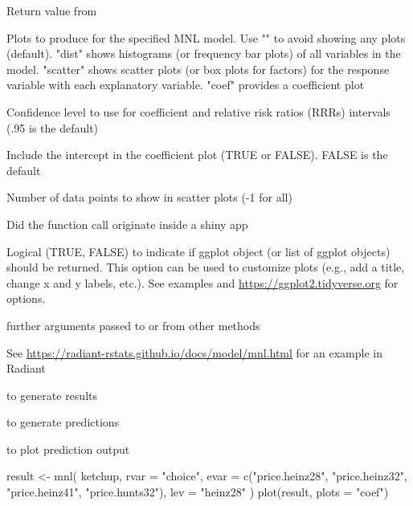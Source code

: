\documentclass[a4paper]{book}
\begin{document}
\begin{Arguments}
\begin{ldescription}
\item[\code{x}] Return value from 

\item[\code{plots}] Plots to produce for the specified MNL model. Use "" to avoid showing any plots (default). "dist" shows histograms (or frequency bar plots) of all variables in the model. "scatter" shows scatter plots (or box plots for factors) for the response variable with each explanatory variable. "coef" provides a coefficient plot

\item[\code{conf\_lev}] Confidence level to use for coefficient and relative risk ratios (RRRs) intervals (.95 is the default)

\item[\code{intercept}] Include the intercept in the coefficient plot (TRUE or FALSE). FALSE is the default

\item[\code{nrobs}] Number of data points to show in scatter plots (-1 for all)

\item[\code{shiny}] Did the function call originate inside a shiny app

\item[\code{custom}] Logical (TRUE, FALSE) to indicate if ggplot object (or list of ggplot objects) should be returned. This option can be used to customize plots (e.g., add a title, change x and y labels, etc.). See examples and \url{https://ggplot2.tidyverse.org} for options.

\item[\code{...}] further arguments passed to or from other methods
\end{ldescription}
\end{Arguments}
%
\begin{Details}
See \url{https://radiant-rstats.github.io/docs/model/mnl.html} for an example in Radiant
\end{Details}
%
\begin{SeeAlso}
 to generate results

 to generate predictions

 to plot prediction output
\end{SeeAlso}
%
\begin{Examples}
\begin{ExampleCode}
result <- mnl(
  ketchup,
  rvar = "choice",
  evar = c("price.heinz28", "price.heinz32", "price.heinz41", "price.hunts32"),
  lev = "heinz28"
)
plot(result, plots = "coef")

\end{ExampleCode}
\end{Examples}
\end{document}
